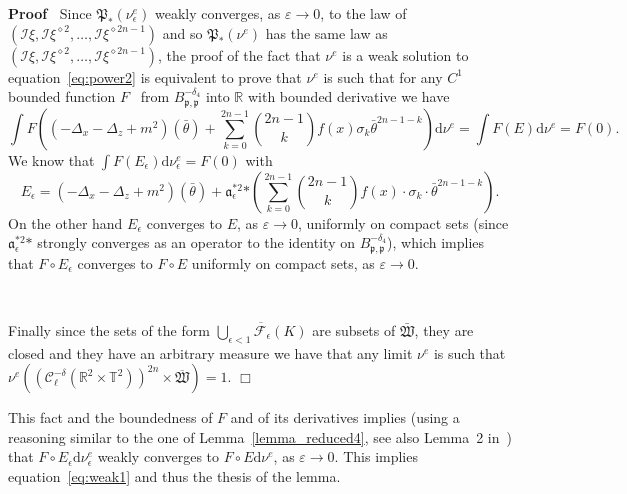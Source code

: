 \documentclass[a4paper,10pt]{article}
\newcommand{\asterisk}{\mathord{*}}
\newcommand{\mathd}{\mathrm{d}}
\newenvironment{proof}{\noindent\textbf{Proof\ }}{\hspace*{\fill}$\Box$\medskip}
\begin{document}
\begin{proof}
  Since $\mathfrak{P}_{\asterisk} (\nu_{\epsilon}^e)$ weakly converges, as
  $\varepsilon \rightarrow 0$, to the law of $(\mathcal{I} \xi, \mathcal{I}
  \xi^{\diamond 2}, \ldots, \mathcal{I} \xi^{\diamond 2 n - 1})$ and so
  $\mathfrak{P}_{\asterisk} (\nu^e)$ has the same law as $(\mathcal{I} \xi,
  \mathcal{I} \xi^{\diamond 2}, \ldots, \mathcal{I} \xi^{\diamond 2 n - 1})$,
  the proof of the fact that $\nu^e$ is a weak solution to
  equation~{\eqref{eq:power2}} is equivalent to prove that $\nu^e$ is such
  that for any $C^1$ bounded function $F$ \ from $B^{-
  \delta_4}_{\mathfrak{p}, \mathfrak{p}}$ into $\mathbb{R}$ with bounded
  derivative we have
  \begin{equation}
    \int F \left( (- \Delta_x - \Delta_z + m^2) (\bar{\theta}) + 
    \sum_{k = 0}^{2 n - 1} \binom{2 n - 1}{k} f (x) \sigma_k \bar{\theta}^{2 n
    - 1 - k} \right) \mathd \nu^e = \int F (E) \mathd \nu^e = F (0) .
    \label{eq:weak1}
  \end{equation}
  We know that $\int F (E_{\epsilon}) \mathd \nu_{\epsilon}^e = F (0)$ with
  \[ E_{\epsilon} = (- \Delta_x - \Delta_z + m^2) (\bar{\theta}) +
     \mathfrak{a}^{\asterisk 2}_{\epsilon} \asterisk \left( \sum_{k = 0}^{2 n
     - 1} \binom{2 n - 1}{k} f (x) \cdot \sigma_k \cdot \bar{\theta}^{2 n - 1
     - k} \right) . \]
  On the other hand $E_{\epsilon}$ converges to $E$, as $\varepsilon
  \rightarrow 0$, uniformly on compact sets (since
  $\mathfrak{a}_{\epsilon}^{\asterisk 2} \asterisk$ strongly converges as an
  operator to the identity on $B^{- \delta_4}_{\mathfrak{p}, \mathfrak{p}}$),
  which implies that $F \circ E_{\epsilon}$ converges to $F \circ E$ uniformly
  on compact sets, as $\varepsilon \rightarrow 0$.
  
  \
  
  Finally since the sets of the form $\overline{\bigcup_{\epsilon < 1}
  \mathcal{F}_{\epsilon} (K)}$ are subsets of $\mathfrak{\bar{W}}$, they are
  closed and they have an arbitrary measure we have that any limit $\nu^e$ is
  such that $\nu^e ((\mathcal{C}^{- \delta}_{\ell} (\mathbb{R}^2 \times
  \mathbb{T}^2))^{2 n} \times \overline{\mathfrak{W}}) = 1$.
\end{proof}

This fact and the boundedness of $F$ and of its derivatives implies (using a
reasoning similar to the one of Lemma~\ref{lemma_reduced4}, see also Lemma~2
in~{\cite{Albeverio2018elliptic}}) that $F \circ E_{\epsilon} \mathd
\nu_{\epsilon}^e$ weakly converges to $F \circ E \mathd \nu^e$, as
$\varepsilon \rightarrow 0$. This implies equation~{\eqref{eq:weak1}} and thus
the thesis of the lemma.
\end{document}
